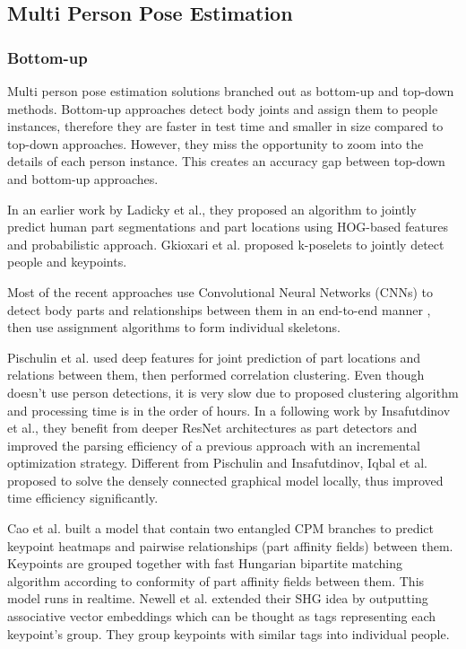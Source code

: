 \documentclass[runningheads]{llncs}
\begin{document}
\subsection{Multi Person Pose Estimation}




\subsubsection{Bottom-up}
Multi person pose estimation solutions branched out as bottom-up and top-down methods. Bottom-up approaches detect body joints and assign them to people instances, therefore they are faster in test time and smaller in size compared to top-down approaches. However, they miss the opportunity to zoom into the details of each person instance. This creates an accuracy gap between top-down and bottom-up approaches. 


In an earlier work by Ladicky et al.\cite{LadickyETHZurich}, they proposed an algorithm to jointly predict human part segmentations and part locations using HOG-based features and probabilistic approach. Gkioxari et al. \cite{Gkioxari2013} proposed k-poselets to jointly detect people and keypoints. 


Most of the  recent approaches use Convolutional Neural Networks (CNNs) to detect body parts and relationships between them in an end-to-end manner \cite{Cao2016, Newell2016b, Varadarajan2017, Pishchulin2015a, Pishchulin2013, Insafutdinov2016}, then use assignment algorithms \cite{Cao2016,Pishchulin2015a,Insafutdinov2016,Varadarajan2017} to form individual skeletons. 


Pischulin et al.\cite{Pishchulin2015a} used deep features for joint prediction of part locations and relations between them, then performed correlation clustering. Even though \cite{Pishchulin2015a} doesn't use person detections, it is very slow due to proposed clustering algorithm and processing time is in the order of hours. In a following work by Insafutdinov et al.\cite{Insafutdinov2016}, they benefit from deeper ResNet architectures as part detectors and improved the parsing efficiency of a previous approach with an incremental optimization strategy. Different from Pischulin and Insafutdinov, Iqbal et al. \cite{Iqbal2016} proposed to solve the densely connected graphical model locally, thus improved time efficiency significantly.  


Cao et al.\cite{Cao2016} built a model that contain two entangled CPM\cite{Wei2016} branches to predict keypoint heatmaps and pairwise relationships (part affinity fields) between them. Keypoints are grouped together with fast Hungarian bipartite matching algorithm according to conformity of part affinity fields between them. This model runs in realtime. Newell et al.\cite{Newell2016b} extended their SHG idea by outputting associative vector embeddings which can be thought as tags representing each keypoint's group. They group keypoints with similar tags into individual people.%
\end{document}
